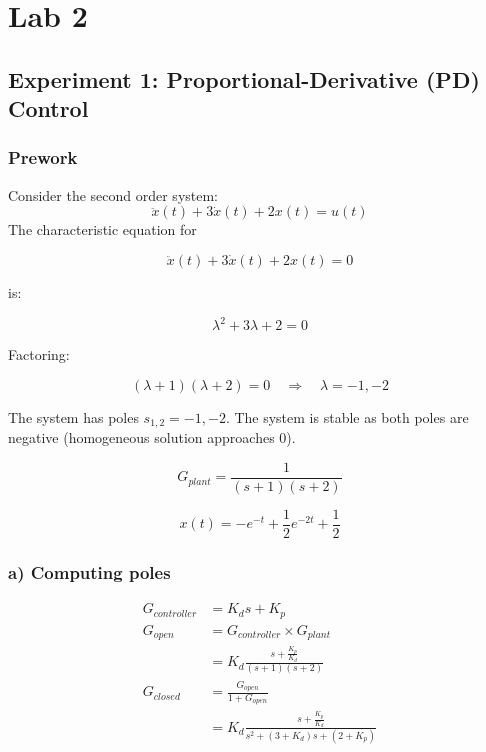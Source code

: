 \documentclass[12pt]{article}
\begin{document}
\section{Lab 2}
\subsection{Experiment 1: Proportional-Derivative (PD) Control}

\subsubsection{Prework}
Consider the second order system:
\begin{equation}
    \ddot x(t) + 3 \dot x(t) + 2x(t) = u(t)
\end{equation}
The characteristic equation for 

\begin{equation}
\ddot{x}(t) + 3\dot{x}(t) + 2x(t) = 0
\end{equation}

is:

\begin{equation}
\lambda^2 + 3\lambda + 2 = 0
\end{equation}

Factoring:

\begin{equation}
(\lambda + 1)(\lambda + 2) = 0 \quad \Rightarrow \quad \lambda = -1, -2
\end{equation}


The system has poles $s_{1, 2} = -1, -2$. The system is stable as both poles are negative (homogeneous solution approaches 0).

 \begin{equation}
     G_{plant} = \frac{1}{(s+1)(s+2)}
 \end{equation}


\begin{equation}
    x(t)=-e^{-t}+\frac{1}{2}e^{-2t}+\frac{1}{2}
\end{equation}

\subsubsection{a) Computing poles}
\begin{align}
    G_{controller}&=K_ds+K_p\\
    G_{open}&=G_{controller}\times G_{plant}\\
    &=K_d\frac{s+\frac{K_p}{K_d}}{(s+1)(s+2)}\\
    G_{closed}&=\frac{G_{open}}{1+G_{open}}\\
    &=K_d\frac{s+\frac{K_p}{K_d}}{s^2+(3+K_d)s+(2+K_p)}
\end{align}
\end{document}
